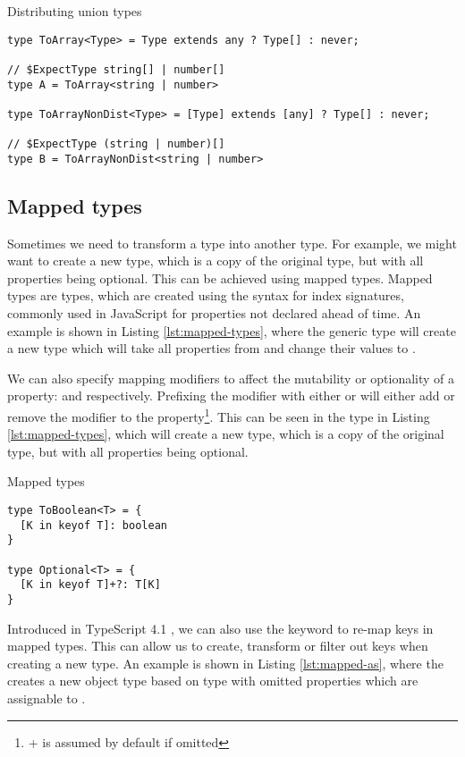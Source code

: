\begin{listing}[ht]
  \caption{Distributing union types}\label{lst:distribute}
  \begin{verbatim}
type ToArray<Type> = Type extends any ? Type[] : never;

// $ExpectType string[] | number[]
type A = ToArray<string | number> 

type ToArrayNonDist<Type> = [Type] extends [any] ? Type[] : never;

// $ExpectType (string | number)[]
type B = ToArrayNonDist<string | number> 
\end{verbatim}
\end{listing}

\subsection{Mapped types}

Sometimes we need to transform a type into another type. For example, we might want to create a new type, which is a copy of the original type, but with all properties being optional. This can be achieved using mapped types. Mapped types are types, which are created using the syntax for index signatures, commonly used in JavaScript for properties not declared ahead of time. An example is shown in Listing \ref{lst:mapped-types}, where the generic type  will create a new type which will take all properties from  and change their values to .

We can also specify mapping modifiers to affect the mutability or optionality of a property:  and  respectively. Prefixing the modifier with either \code{+} or \code{-} will either add or remove the modifier to the property\footnote{+ is assumed by default if omitted}. This can be seen in the  type in Listing \ref{lst:mapped-types}, which will create a new type, which is a copy of the original type, but with all properties being optional.

\begin{listing}[ht]
  \caption{Mapped types}\label{lst:mapped-types}
  \begin{verbatim}
type ToBoolean<T> = {
  [K in keyof T]: boolean
}

type Optional<T> = {
  [K in keyof T]+?: T[K]
}
\end{verbatim}
\end{listing}

Introduced in TypeScript 4.1 \cite{rosenwasserAnnouncingTypeScript2020}, we can also use the  keyword to re-map keys in mapped types. This can allow us to create, transform or filter out keys when creating a new type. An example is shown in Listing \ref{lst:mapped-as}, where the  creates a new object type based on type  with omitted properties which are assignable to .

